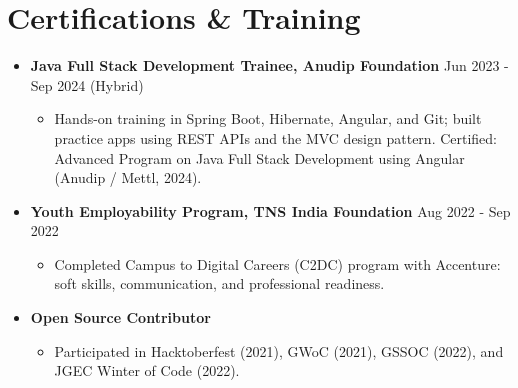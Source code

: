 \documentclass[a4paper,11pt]{article}
\begin{document}
\section{\textbf{Certifications \& Training}}
\begin{itemize}[left=0pt, itemsep=0pt, topsep=0pt]
    \item \textbf{Java Full Stack Development Trainee, Anudip Foundation} \hfill Jun 2023 - Sep 2024 (Hybrid)
    \begin{itemize}[left=10pt, itemsep=0pt, topsep=0pt]
        \item Hands-on training in Spring Boot, Hibernate, Angular, and Git; built practice apps using REST APIs and the MVC design pattern. Certified: Advanced Program on Java Full Stack Development using Angular (Anudip / Mettl, 2024).
    \end{itemize}

    \item \textbf{Youth Employability Program, TNS India Foundation} \hfill Aug 2022 - Sep 2022
    \begin{itemize}[left=10pt, itemsep=0pt, topsep=0pt]
        \item Completed Campus to Digital Careers (C2DC) program with Accenture: soft skills, communication, and professional readiness.
    \end{itemize}

    \item \textbf{Open Source Contributor}
    \begin{itemize}[left=10pt, itemsep=0pt, topsep=0pt]
        \item Participated in Hacktoberfest (2021), GWoC (2021), GSSOC (2022), and JGEC Winter of Code (2022).
    \end{itemize}
\end{itemize}

\end{document}
